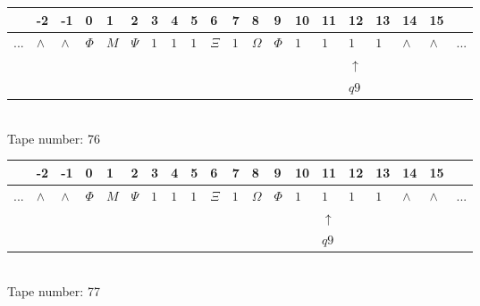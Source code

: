 \documentclass[11pt]{article}
\begin{document}
\begin{table}[H]
\centering
\begin{tabular}{llllllllllllllllllll}
 & -2 & -1 & 0 & 1 & 2 & 3 & 4 & 5 & 6 & 7 & 8 & 9 & 10 & 11 & 12 & 13 & 14 & 15 & \\
\hline
$...$ & \multicolumn{1}{|l|}{$\wedge$} & \multicolumn{1}{|l|}{$\wedge$} & \multicolumn{1}{|l|}{$\Phi$} & \multicolumn{1}{|l|}{$M$} & \multicolumn{1}{|l|}{$\Psi$} & \multicolumn{1}{|l|}{$1$} & \multicolumn{1}{|l|}{$1$} & \multicolumn{1}{|l|}{$1$} & \multicolumn{1}{|l|}{$\Xi$} & \multicolumn{1}{|l|}{$1$} & \multicolumn{1}{|l|}{$\Omega$} & \multicolumn{1}{|l|}{$\Phi$} & \multicolumn{1}{|l|}{$1$} & \multicolumn{1}{|l|}{$1$} & \multicolumn{1}{|l|}{$1$} & \multicolumn{1}{|l|}{$1$} & \multicolumn{1}{|l|}{$\wedge$} & \multicolumn{1}{|l|}{$\wedge$} & $...$\\
\hline
&  &  &  &  &  &  &  &  &  &  &  &  &  &  & $\uparrow$ &  &  &  &  \\
&  &  &  &  &  &  &  &  &  &  &  &  &  &  & $ q9 $ &  &  &  &  \\
\end{tabular}
\\
Tape number: 76
\noindent\makebox[\linewidth]{\hdashrule{\textwidth}{1pt}{1pt}}\end{table}

\begin{table}[H]
\centering
\begin{tabular}{llllllllllllllllllll}
 & -2 & -1 & 0 & 1 & 2 & 3 & 4 & 5 & 6 & 7 & 8 & 9 & 10 & 11 & 12 & 13 & 14 & 15 & \\
\hline
$...$ & \multicolumn{1}{|l|}{$\wedge$} & \multicolumn{1}{|l|}{$\wedge$} & \multicolumn{1}{|l|}{$\Phi$} & \multicolumn{1}{|l|}{$M$} & \multicolumn{1}{|l|}{$\Psi$} & \multicolumn{1}{|l|}{$1$} & \multicolumn{1}{|l|}{$1$} & \multicolumn{1}{|l|}{$1$} & \multicolumn{1}{|l|}{$\Xi$} & \multicolumn{1}{|l|}{$1$} & \multicolumn{1}{|l|}{$\Omega$} & \multicolumn{1}{|l|}{$\Phi$} & \multicolumn{1}{|l|}{$1$} & \multicolumn{1}{|l|}{$1$} & \multicolumn{1}{|l|}{$1$} & \multicolumn{1}{|l|}{$1$} & \multicolumn{1}{|l|}{$\wedge$} & \multicolumn{1}{|l|}{$\wedge$} & $...$\\
\hline
&  &  &  &  &  &  &  &  &  &  &  &  &  & $\uparrow$ &  &  &  &  &  \\
&  &  &  &  &  &  &  &  &  &  &  &  &  & $ q9 $ &  &  &  &  &  \\
\end{tabular}
\\
Tape number: 77
\noindent\makebox[\linewidth]{\hdashrule{\textwidth}{1pt}{1pt}}\end{table}
\clearpage
\end{document}
